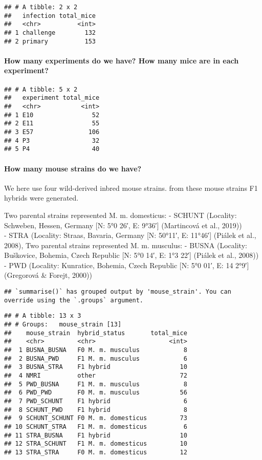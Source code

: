 \documentclass[
]{article}
\begin{document}
\begin{verbatim}
## # A tibble: 2 x 2
##   infection total_mice
##   <chr>          <int>
## 1 challenge        132
## 2 primary          153
\end{verbatim}

\hypertarget{how-many-experiments-do-we-have-how-many-mice-are-in-each-experiment}{%
\paragraph{How many experiments do we have? How many mice are in each
experiment?}\label{how-many-experiments-do-we-have-how-many-mice-are-in-each-experiment}}

\begin{verbatim}
## # A tibble: 5 x 2
##   experiment total_mice
##   <chr>           <int>
## 1 E10                52
## 2 E11                55
## 3 E57               106
## 4 P3                 32
## 5 P4                 40
\end{verbatim}

\hypertarget{how-many-mouse-strains-do-we-have}{%
\paragraph{How many mouse strains do we
have?}\label{how-many-mouse-strains-do-we-have}}

We here use four wild-derived inbred mouse strains. from these mouse
strains F1 hybrids were generated.

Two parental strains represented M. m. domesticus: - SCHUNT (Locality:
Schweben, Hessen, Germany {[}N: 5°0 26′, E: 9°36′{]} (Martincová et al.,
2019))\\
- STRA (Locality: Straas, Bavaria, Germany {[}N: 50°11′, E: 11°46′{]}
(Piálek et al., 2008), Two parental strains represented M. m. musculus:
- BUSNA (Locality: Buškovice, Bohemia, Czech Republic {[}N: 5°0 14′, E:
1°3 22′{]} (Piálek et al., 2008)) - PWD (Locality: Kunratice, Bohemia,
Czech Republic {[}N: 5°0 01′, E: 14 2°9′{]} (Gregorová \& Forejt, 2000))

\begin{verbatim}
## `summarise()` has grouped output by 'mouse_strain'. You can override using the `.groups` argument.
\end{verbatim}

\begin{verbatim}
## # A tibble: 13 x 3
## # Groups:   mouse_strain [13]
##    mouse_strain  hybrid_status       total_mice
##    <chr>         <chr>                    <int>
##  1 BUSNA_BUSNA   F0 M. m. musculus            8
##  2 BUSNA_PWD     F1 M. m. musculus            6
##  3 BUSNA_STRA    F1 hybrid                   10
##  4 NMRI          other                       72
##  5 PWD_BUSNA     F1 M. m. musculus            8
##  6 PWD_PWD       F0 M. m. musculus           56
##  7 PWD_SCHUNT    F1 hybrid                    6
##  8 SCHUNT_PWD    F1 hybrid                    8
##  9 SCHUNT_SCHUNT F0 M. m. domesticus         73
## 10 SCHUNT_STRA   F1 M. m. domesticus          6
## 11 STRA_BUSNA    F1 hybrid                   10
## 12 STRA_SCHUNT   F1 M. m. domesticus         10
## 13 STRA_STRA     F0 M. m. domesticus         12
\end{verbatim}
\end{document}
